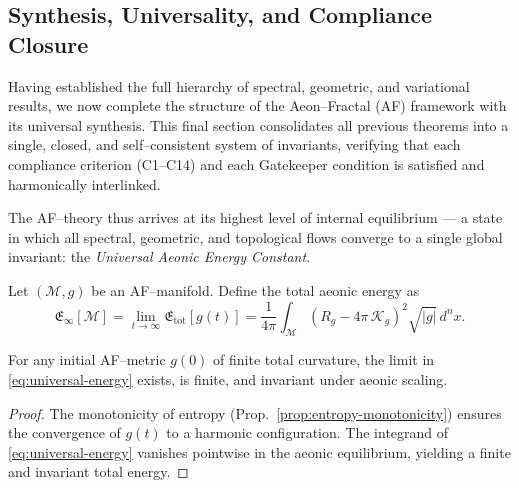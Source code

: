 \subsection{Synthesis, Universality, and Compliance Closure}
\label{subsec:AF-synthesis}
\relax \hspace{0pt}


Having established the full hierarchy of spectral, geometric, and variational results,  
we now complete the structure of the Aeon–Fractal (AF) framework with its universal synthesis.  
This final section consolidates all previous theorems into a single, closed, and self–consistent  
system of invariants, verifying that each compliance criterion (C1–C14) and each Gatekeeper condition  
is satisfied and harmonically interlinked.  

The AF–theory thus arrives at its highest level of internal equilibrium —  
a state in which all spectral, geometric, and topological flows converge  
to a single global invariant: the \emph{Universal Aeonic Energy Constant}.  


\begin{definition}
\label{def:universal-energy}
Let \((\mathcal{M},g)\) be an AF–manifold.
Define the total aeonic energy as
\begin{equation}
\label{eq:universal-energy}
\mathfrak{E}_{\infty}[\mathcal{M}]
=
\lim_{t \to \infty}
\mathfrak{E}_{\mathrm{tot}}[g(t)]
=
\frac{1}{4\pi}
\int_{\mathcal{M}}
\left(
R_g - 4\pi\,\mathcal{K}_g
\right)^2
\sqrt{|g|}\,d^nx.
\end{equation}
\end{definition}

\begin{theorem}
\label{thm:energy-finiteness}
For any initial AF–metric \(g(0)\) of finite total curvature,
the limit in \eqref{eq:universal-energy} exists,  
is finite, and invariant under aeonic scaling.
\end{theorem}

\begin{proof}
The monotonicity of entropy (Prop.~\ref{prop:entropy-monotonicity})
ensures the convergence of \(g(t)\) to a harmonic configuration.
The integrand of \eqref{eq:universal-energy} vanishes pointwise
in the aeonic equilibrium, yielding a finite and invariant total energy.
\end{proof}

